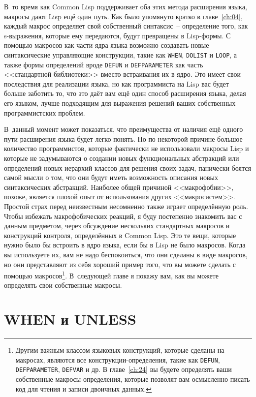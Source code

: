 В~то время как Common Lisp поддерживает оба этих метода расширения языка, макросы дают
Lisp ещё один путь.  Как было упомянуто кратко в главе~\ref{ch:04}, каждый макрос определяет свой
собственный синтаксис~-- определение того, как s-выражения, которые ему передаются, будут
превращены в Lisp-формы. С помощью макросов как части ядра языка возможно создавать
новые синтаксические управляющие конструкции, такие как \lstinline{WHEN}, \lstinline{DOLIST} и
\lstinline{LOOP}, а также формы определений вроде \lstinline{DEFUN} и \lstinline{DEFPARAMETER} как
часть <<стандартной библиотеки>> вместо встраивания их в ядро. Это имеет свои последствия
для реализации языка, но как программиста на Lisp вас будет больше заботить то, что это
даёт вам ещё один способ расширения языка, делая его языком, лучше подходящим для
выражения решений ваших собственных программистских проб\-лем.

В~данный момент может показаться, что преимущества от наличия ещё одного пути расширения
языка будет легко понять. Но по некоторой причине большое количество программистов,
которые фактически не использовали макросы Lisp и которые не задумываются о создании новых
функциональных абстракций или определений новых иерархий классов для решения своих задач,
панически боятся самой мысли о том, что они будут иметь возможность описания новых
синтаксических абстракций. Наиболее общей причиной <<макрофобии>>, похоже, является плохой
опыт от использования других <<макросистем>>. Простой страх перед неизвестным несомненно
также играет определённую роль. Чтобы избежать макрофобических реакций, я буду постепенно
знакомить вас с данным предметом, через обсуждение нескольких стандартных макросов и
конструкций контроля, определённых в Common Lisp. Это те вещи, которые нужно было бы
встроить в ядро языка, если бы в Lisp не было макросов. Когда вы используете их, вам не
надо беспокоиться, что они сделаны в виде макросов, но они представляют из себя хороший
пример того, что вы можете сделать с помощью макросов\footnote{Другим важным классом
  языковых конструкций, которые сделаны на макросах, являются все конструкции-определения,
  такие как \lstinline{DEFUN}, \lstinline{DEFPARAMETER}, \lstinline{DEFVAR} и др. В
  главе~\ref{ch:24} вы будете определять ваши собственные макросы-определения, которые
  позволят вам осмысленно писать код для чтения и записи двоичных данных.}. В~следующей
главе я покажу вам, как вы можете определять свои собственные макросы.

\section{WHEN и UNLESS}


